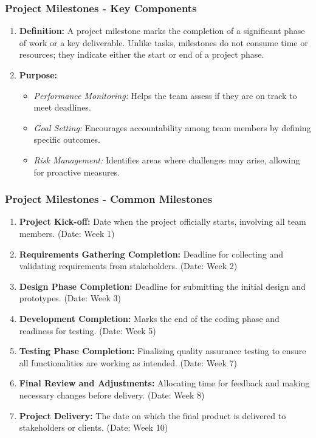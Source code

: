 \documentclass[aspectratio=169]{beamer}
\begin{document}
\begin{frame}[fragile]
    \frametitle{Project Milestones - Key Components}
    \begin{enumerate}
        \item \textbf{Definition:} 
            A project milestone marks the completion of a significant phase of work or a key deliverable. Unlike tasks, milestones do not consume time or resources; they indicate either the start or end of a project phase.
        
        \item \textbf{Purpose:} 
        \begin{itemize}
            \item \textit{Performance Monitoring:} Helps the team assess if they are on track to meet deadlines.
            \item \textit{Goal Setting:} Encourages accountability among team members by defining specific outcomes.
            \item \textit{Risk Management:} Identifies areas where challenges may arise, allowing for proactive measures.
        \end{itemize}
    \end{enumerate}
\end{frame}

\begin{frame}[fragile]
    \frametitle{Project Milestones - Common Milestones}
    \begin{enumerate}
        \item \textbf{Project Kick-off:} 
            Date when the project officially starts, involving all team members. (Date: Week 1)
        
        \item \textbf{Requirements Gathering Completion:} 
            Deadline for collecting and validating requirements from stakeholders. (Date: Week 2)
        
        \item \textbf{Design Phase Completion:} 
            Deadline for submitting the initial design and prototypes. (Date: Week 3)
        
        \item \textbf{Development Completion:} 
            Marks the end of the coding phase and readiness for testing. (Date: Week 5)
        
        \item \textbf{Testing Phase Completion:} 
            Finalizing quality assurance testing to ensure all functionalities are working as intended. (Date: Week 7)
        
        \item \textbf{Final Review and Adjustments:} 
            Allocating time for feedback and making necessary changes before delivery. (Date: Week 8)
        
        \item \textbf{Project Delivery:} 
            The date on which the final product is delivered to stakeholders or clients. (Date: Week 10)
    \end{enumerate}
\end{frame}
\end{document}
